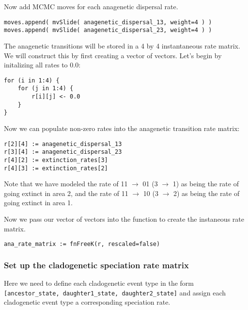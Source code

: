 Now add MCMC moves for each anagenetic dispersal rate.
{\tt \begin{snugshade*}
\begin{lstlisting}
moves.append( mvSlide( anagenetic_dispersal_13, weight=4 ) )
moves.append( mvSlide( anagenetic_dispersal_23, weight=4 ) )
\end{lstlisting}
\end{snugshade*}}

The anagenetic transitions will be stored in a 4 by 4
instantaneous rate matrix. We will construct this by
first creating a vector of vectors. Let's begin by 
initalizing all rates to 0.0:
{\tt \begin{snugshade*}
\begin{lstlisting}
for (i in 1:4) {
    for (j in 1:4) {
        r[i][j] <- 0.0
    }
}
\end{lstlisting}
\end{snugshade*}}

Now we can populate non-zero rates into the anagenetic transition rate matrix:
{\tt \begin{snugshade*}
\begin{lstlisting}
r[2][4] := anagenetic_dispersal_13
r[3][4] := anagenetic_dispersal_23
r[4][2] := extinction_rates[3]
r[4][3] := extinction_rates[2]
\end{lstlisting}
\end{snugshade*}}
Note that we have modeled the rate of 11 $\rightarrow$ 01 (3 $\rightarrow$ 1) as being
the rate of going extinct in area 2, and the rate of 11 $\rightarrow$ 10 (3 $\rightarrow$ 2) 
as being the rate of going extinct in area 1. 

Now we pass our vector of vectors into the  function to create
the instaneous rate matrix.
{\tt \begin{snugshade*}
\begin{lstlisting}
ana_rate_matrix := fnFreeK(r, rescaled=false)
\end{lstlisting}
\end{snugshade*}}

\subsubsection{Set up the cladogenetic speciation rate matrix}

Here we need to define each cladogenetic event type in the form
\texttt{[ancestor\_state, daughter1\_state, daughter2\_state]}
and assign each cladogenetic event type a corresponding 
speciation rate.

